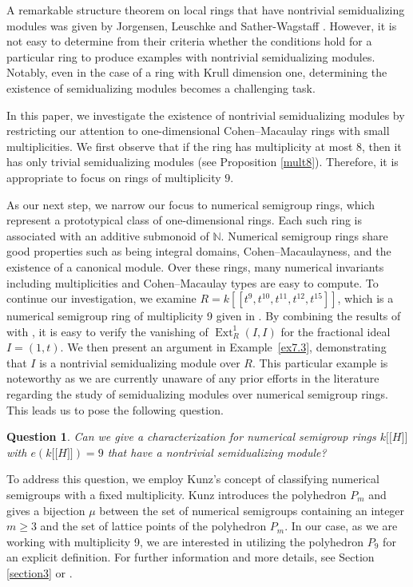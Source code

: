 \documentclass{amsart}
\newcommand{\ldb}{\mathopen{[\![}} %
\newcommand{\rdb}{\mathclose{]\!]}} %
\DeclareMathOperator{\Ext}{Ext}
\theoremstyle{plain}
\newtheorem{question}[theorem]{Question}
\theoremstyle{definition}
\numberwithin{theorem}{section}
\numberwithin{equation}{section}
\numberwithin{equation}{theorem}
\begin{document}
A remarkable structure theorem on local rings that have nontrivial semidualizing modules was given by Jorgensen, Leuschke and Sather-Wagstaff \cite{JLSW}.
However, it is not easy to determine from their criteria whether the conditions hold for a particular ring to produce examples with nontrivial semidualizing modules. Notably, even in the case of a ring with Krull dimension one, determining the existence of semidualizing modules becomes a challenging task.


In this paper, we investigate the existence of nontrivial semidualizing modules by restricting our attention to one-dimensional Cohen--Macaulay rings with small multiplicities.
We first observe that if the ring has multiplicity at most $8$, then it has only trivial semidualizing modules (see Proposition \ref{mult8}).
Therefore, it is appropriate to focus on rings of multiplicity $9$.

As our next step, we narrow our focus to numerical semigroup rings, which represent a prototypical class of one-dimensional rings.
Each such ring is associated with an additive submonoid of $\mathbb{N}$.
Numerical semigroup rings share good properties such as being integral domains, Cohen--Macaulayness, and the existence of a canonical module.
Over these rings, many numerical invariants including multiplicities and Cohen--Macaulay types are easy to compute.
To continue our investigation, we examine $R=k[\![t^9,t^{10},t^{11},t^{12},t^{15}]\!]$, which is a numerical semigroup ring of multiplicity 9 given in \cite{GTTT}.
By combining the results of \cite{GTTT} with \cite[Lemma 4.6]{HW}, it is easy to verify the vanishing of $\Ext^1_R(I,I)$ for the fractional ideal $I = (1,t)$.
We then present an argument in Example~\ref{ex7.3}, demonstrating that $I$ is a nontrivial semidualizing module over $R$.
This particular example is noteworthy as we are currently unaware of any prior efforts in the literature regarding the study of semidualizing modules over numerical semigroup rings. This leads us to pose the following question.


\begin{question}\label{Question2} Can we give a characterization for numerical semigroup rings $k \ldb H \rdb$ with $e(k \ldb H \rdb)=9$ that have a nontrivial semidualizing module? 
\end{question}


To address this question, we employ Kunz's concept of classifying numerical semigroups with a fixed multiplicity. Kunz introduces the polyhedron $P_m$ and
gives a bijection $\mu$ between the set of numerical semigroups containing an integer $m \geq 3$ and the set of lattice points of the polyhedron $P_m$. 
In our case, as we are working with multiplicity 9, we are interested in utilizing the polyhedron $P_9$ for an explicit definition. For further information and more details, see Section \ref{section3} or \cite{K}. 
\end{document}
